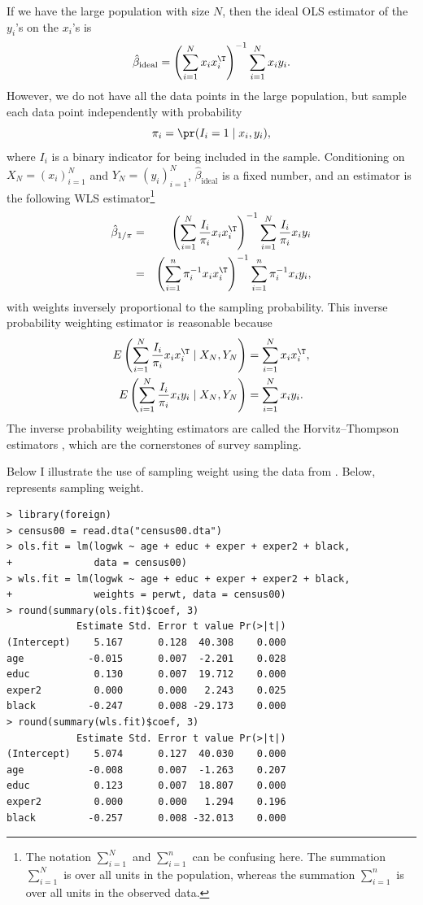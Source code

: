 If we have the large population with size $N$, then the ideal OLS
estimator of the $y_i$'s on the $x_i$'s is
\[
\hat{\beta}_{\text{ideal}}=\left(\sum_{i=1}^{N}x_{i}x_{i}^{\T}\right)^{-1}\sum_{i=1}^{N}x_{i}y_{i}.
\]
However, we do not have all the data points in the large population,
but sample each data point independently with probability
\[
\pi_{i}=\pr(I_{i}=1\mid x_{i},y_{i}),
\]
where $I_{i}$ is a binary indicator for being included in the sample.
Conditioning on $X_N = (x_{i})_{i=1}^N$ and $Y_N = (y_{i})_{i=1}^{N}$, $\hat{\beta}_{\text{ideal}}$ is a fixed number, and an estimator is
the following WLS estimator\footnote{
The notation $\sum_{i=1}^{N}$ and $\sum_{i=1}^{n}$ can be confusing here. The summation $\sum_{i=1}^{N}$ is over all units in the population, whereas the summation $\sum_{i=1}^{n}$ is over all units in the observed data. 
}
\begin{eqnarray*}
\hat{\beta}_{1/\pi} 
&=& \left(\sum_{i=1}^{N}\frac{I_{i}}{\pi_{i}}x_{i}x_{i}^{\T}\right)^{-1}\sum_{i=1}^{N}\frac{I_{i}}{\pi_{i}}x_{i}y_{i}  \\
&=&\left(\sum_{i=1}^{n}\pi_{i}^{-1}x_{i}x_{i}^{\T}\right)^{-1}\sum_{i=1}^{n}\pi_{i}^{-1}x_{i}y_{i},
\end{eqnarray*}
with weights inversely proportional to the sampling probability. This
inverse probability weighting estimator is reasonable because 
\begin{align*}
E\left(\sum_{i=1}^{N}\frac{I_{i}}{\pi_{i}}x_{i}x_{i}^{\T}\mid X_N,Y_N\right) & =\sum_{i=1}^{N}x_{i}x_{i}^{\T},\\
E\left(\sum_{i=1}^{N}\frac{I_{i}}{\pi_{i}}x_{i}y_{i}\mid X_N,Y_N\right) & =\sum_{i=1}^{N}x_{i}y_{i}.
\end{align*}
The inverse probability weighting estimators are called
the Horvitz--Thompson estimators \citep{horvitz1952generalization}, which are the cornerstones of survey sampling. 


Below I illustrate the use of sampling weight using the data from \citet{angrist2006quantile}. Below,  represents sampling weight. 


\begin{lstlisting}
> library(foreign)
> census00 = read.dta("census00.dta")
> ols.fit = lm(logwk ~ age + educ + exper + exper2 + black,
+              data = census00)
> wls.fit = lm(logwk ~ age + educ + exper + exper2 + black,
+              weights = perwt, data = census00)
> round(summary(ols.fit)$coef, 3)
            Estimate Std. Error t value Pr(>|t|)
(Intercept)    5.167      0.128  40.308    0.000
age           -0.015      0.007  -2.201    0.028
educ           0.130      0.007  19.712    0.000
exper2         0.000      0.000   2.243    0.025
black         -0.247      0.008 -29.173    0.000
> round(summary(wls.fit)$coef, 3)
            Estimate Std. Error t value Pr(>|t|)
(Intercept)    5.074      0.127  40.030    0.000
age           -0.008      0.007  -1.263    0.207
educ           0.123      0.007  18.807    0.000
exper2         0.000      0.000   1.294    0.196
black         -0.257      0.008 -32.013    0.000
\end{lstlisting}




